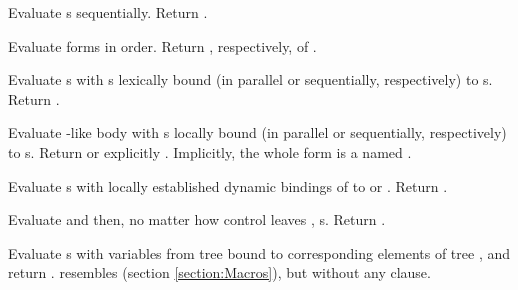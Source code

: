 \begin{LIST}{1cm}
  {\label{:progn}
    Evaluate s sequentially. Return
    .
  }

  {
  Evaluate forms in order. Return ,
  respectively, of . 
  }

  {
  Evaluate s with s lexically bound (in parallel or
  sequentially, respectively) to s. Return
  . 
  }

  {
  Evaluate -like body with s locally bound (in
  parallel or sequentially, respectively) to s. Return
  \retval{\NIL} or explicitly .
  Implicitly, the whole form is a  named \NIL. 
  }

  {
  Evaluate s with locally established dynamic bindings of
   to  or \NIL. Return . 
  }

  {
  Evaluate  and then, no matter how control leaves
  , s. Return . 
  }

  {
  Evaluate s with variables from tree  bound to
  corresponding elements of tree , and return .  resembles 
  (section \ref{section:Macros}), but without any 
  clause. 
  }


\end{LIST}
